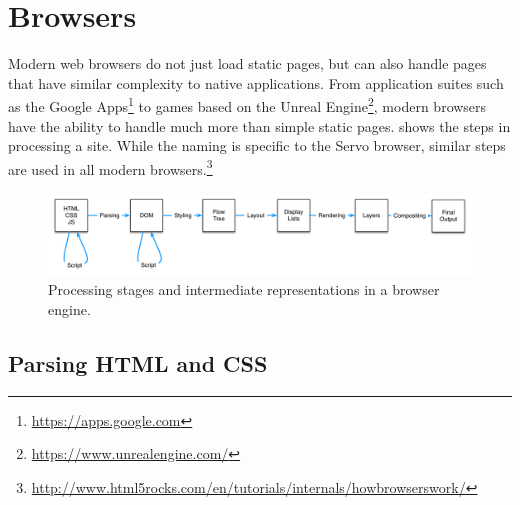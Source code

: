 
\section{Browsers}
\label{sec:browsers}

Modern web browsers do not just load static pages, but can also handle pages that have similar
complexity to native applications.
From application suites such as the Google Apps\footnote{\url{https://apps.google.com}} to games
based on the Unreal Engine\footnote{\url{https://www.unrealengine.com/}},
modern browsers have the ability to handle much more than simple static pages.
 shows the steps in processing a site.
While the naming is specific to the Servo browser, similar steps are used in all modern browsers.\footnote{\url{http://www.html5rocks.com/en/tutorials/internals/howbrowserswork/}}
\begin{figure}[ht]
  \begin{center}
    \includegraphics[scale=0.55]{pics/browser}
  \end{center}%
  \caption{Processing stages and intermediate representations in a browser engine.}
  \label{fig:browser}
\end{figure}%

\subsection{Parsing HTML and CSS}

